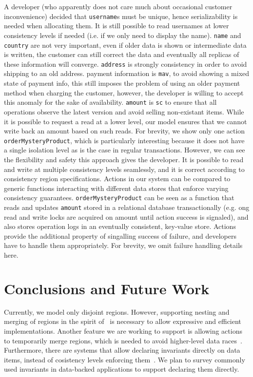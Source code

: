 \documentclass[preprint, numbers]{sigplanconf}
\begin{document}
A developer (who apparently does not care much about occasional customer inconvenience)
decided that \texttt{username}s must be unique, hence serializability is needed
when allocating them. It is still possible to read usernames at lower
consistency levels if needed (i.e. if we only need to display the name). \texttt{name} and \texttt{country} are not very important, even if older
data is shown or intermediate data is written, the customer can still correct
the data and eventually all replicas of these information will converge.
\texttt{address} is strongly consistency in order to avoid shipping to an old address.
payment information is \texttt{mav}, to avoid showing a mixed state of payment info, this still
imposes the problem of using an older payment method when charging the customer,
however, the developer is willing to accept this anomaly for the sake of
availability. \texttt{amount} is \texttt{sc} to ensure that all operations
observe the latest version and avoid selling non-existant items. While it is possible to request a read at a lower
level, our model ensures that we cannot write back an amount based on such reads. For brevity,
we show only one action \texttt{orderMysteryProduct}, which is particularly interesting because it does
not have a single isolation level as is the case in regular transactions.
However, we can see the flexibility and safety this approach gives the
developer. It is possible to read and write at multiple consistency levels
seamlessly, and it is correct according to consistency region specifications.
Actions in our system can be compared to generic functions interacting
with different data stores that enforce varying consistency guarantees.
\texttt{orderMysteryProduct}  can be seen as a function that
reads and updates \texttt{amount} stored in a relational database
transactionally (e.g. ong read and write locks are acquired on amount until
action success is signaled), and also stores operation logs in an eventually consistent,
key-value store. Actions provide the additional property of singalling success
of failure, and developers have to handle them appropriately. For brevity, we omit failure handling details here.

\section{Conclusions and Future Work}
Currently, we model only disjoint regions. However, supporting
nesting and merging of regions in the spirit of~\cite{dolby2012data} is necessary to allow expressive and efficient
implementations. Another feature we are working to support is allowing actions to temporarily merge regions, which
is needed to avoid higher-level data races~\cite{artho2003high}. Furthermore, there are systems
that allow declaring invariants directly on data items, instead of 
cosistency levels enforcing them~\cite{bailis2015feral}. We plan to survey commonly used
invariants in data-backed applications to support declaring them directly.








\end{document}
